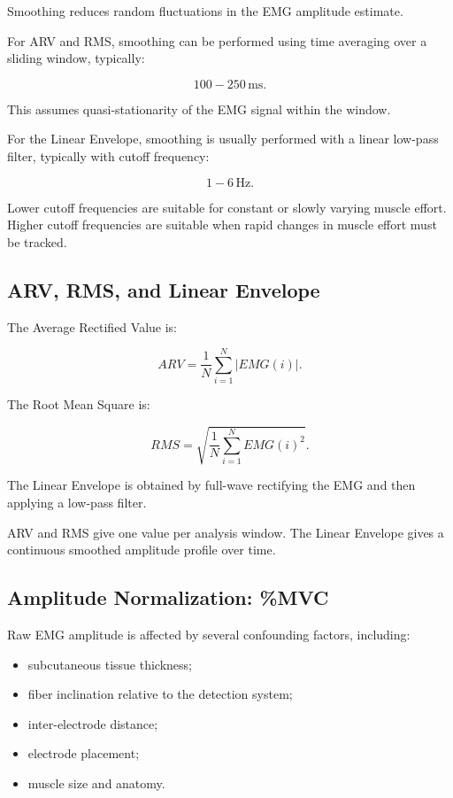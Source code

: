 Smoothing reduces random fluctuations in the EMG amplitude estimate.

For ARV and RMS, smoothing can be performed using time averaging over a sliding window, typically:

\[
100-250\,\text{ms}.
\]

This assumes quasi-stationarity of the EMG signal within the window.

For the Linear Envelope, smoothing is usually performed with a linear low-pass filter, typically with cutoff frequency:

\[
1-6\,\text{Hz}.
\]

Lower cutoff frequencies are suitable for constant or slowly varying muscle effort. Higher cutoff frequencies are suitable when rapid changes in muscle effort must be tracked.

\subsection{ARV, RMS, and Linear Envelope}

The Average Rectified Value is:

\[
ARV =
\frac{1}{N}
\sum_{i=1}^{N}
|EMG(i)|.
\]

The Root Mean Square is:

\[
RMS =
\sqrt{
\frac{1}{N}
\sum_{i=1}^{N}
EMG(i)^2
}.
\]

The Linear Envelope is obtained by full-wave rectifying the EMG and then applying a low-pass filter.

\begin{authornote}
ARV and RMS give one value per analysis window. The Linear Envelope gives a continuous smoothed amplitude profile over time.
\end{authornote}

\subsection{Amplitude Normalization: \%MVC}

Raw EMG amplitude is affected by several confounding factors, including:

\begin{itemize}[noitemsep]
    \item subcutaneous tissue thickness;
    \item fiber inclination relative to the detection system;
    \item inter-electrode distance;
    \item electrode placement;
    \item muscle size and anatomy.
\end{itemize}

